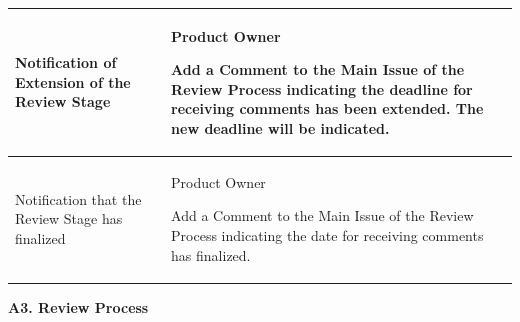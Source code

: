 \documentclass{template/openetcs_article}
\begin{document}
\begin{flushleft}
\begin{supertabular}{|m{3cm}|m{12cm}|}
Notification of Extension of the Review Stage &
\begin{description}
\item Product Owner\
\item Add a Comment to the Main Issue of the Review Process indicating the deadline for receiving comments has been extended. The new deadline will be indicated.
\end{description}\\\hline
Notification that the Review Stage has finalized &
\begin{description}
\item Product Owner\
\item Add a Comment to the Main Issue of the Review Process indicating the date for receiving comments has finalized.
\end{description} 
\\\hline
\end{supertabular}
\end{flushleft}

\textbf{A3. Review Process}
\end{document}
